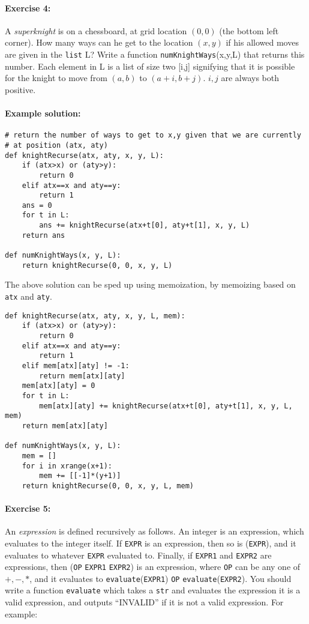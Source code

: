 \documentclass[11pt]{article}
\begin{document}
\paragraph{Exercise 4:}
A {\em superknight} is on a chessboard, at grid location $(0,0)$ (the
bottom left corner).  How many ways can he get to the location
$(x,y)$ if his allowed moves are given in the \texttt{list} L?  Write
a function \texttt{numKnightWays}(x,y,L) that returns this number.
Each element in L is a list of size two [i,j] signifying that it is
possible for the knight to move from $(a,b)$ to $(a+i, b+j)$.  $i,j$
are always both positive.

\paragraph{Example solution:}
\begin{verbatim}
# return the number of ways to get to x,y given that we are currently
# at position (atx, aty)
def knightRecurse(atx, aty, x, y, L):
    if (atx>x) or (aty>y):
        return 0
    elif atx==x and aty==y:
        return 1
    ans = 0
    for t in L:
        ans += knightRecurse(atx+t[0], aty+t[1], x, y, L)
    return ans

def numKnightWays(x, y, L):
    return knightRecurse(0, 0, x, y, L)
\end{verbatim}

The above solution can be sped up using memoization, by memoizing
based on \texttt{atx} and \texttt{aty}.

\begin{verbatim}
def knightRecurse(atx, aty, x, y, L, mem):
    if (atx>x) or (aty>y):
        return 0
    elif atx==x and aty==y:
        return 1
    elif mem[atx][aty] != -1:
        return mem[atx][aty]
    mem[atx][aty] = 0
    for t in L:
        mem[atx][aty] += knightRecurse(atx+t[0], aty+t[1], x, y, L, mem)
    return mem[atx][aty]

def numKnightWays(x, y, L):
    mem = []
    for i in xrange(x+1):
        mem += [[-1]*(y+1)]
    return knightRecurse(0, 0, x, y, L, mem)
\end{verbatim}

\paragraph{Exercise 5:}
An {\em expression} is defined recursively as follows.  An integer is
an expression, which evaluates to the integer itself.  If
\texttt{EXPR} is an expression, then so is
(\texttt{EXPR}), and it evaluates to whatever \texttt{EXPR} evaluated
to.  Finally, if \texttt{EXPR1} and \texttt{EXPR2} are
expressions, then (\texttt{OP} \texttt{EXPR1} \texttt{EXPR2}) is an
expression, where \texttt{OP} can be any one of $+,-,*$, and it
evaluates to \texttt{evaluate}(\texttt{EXPR1}) \texttt{OP}
\texttt{evaluate}(\texttt{EXPR2}).  You should
write a function \texttt{evaluate} which takes a \texttt{str} and
evaluates the expression it is a valid expression, and outputs
``INVALID'' if it is not a valid expression.  For example:
\end{document}
